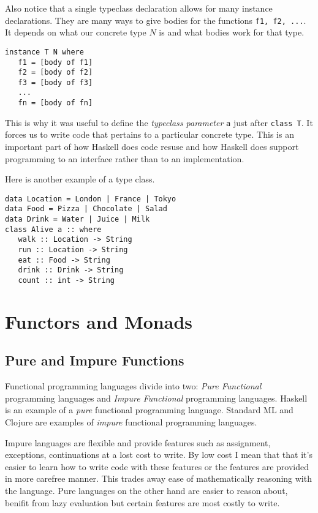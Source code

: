 Also notice that a single typeclass declaration allows for many instance declarations. 
They are many ways to give bodies for the functions \lstinline{f1, f2, ...}. 
It depends on what our concrete type $N$ is and what bodies work for that type. 

\begin{lstlisting}
instance T N where
   f1 = [body of f1]
   f2 = [body of f2]
   f3 = [body of f3]
   ...
   fn = [body of fn]
\end{lstlisting}

This is why it was useful to define the \textit{typeclass parameter}
\lstinline{a} just after \lstinline{class T}. It forces us to write 
 code that pertains to a particular concrete type. 
This is an important part of how Haskell does code resuse and how Haskell 
does support programming to an interface rather than to an implementation. 




Here is another example of a type class. 
\begin{lstlisting}
data Location = London | France | Tokyo
data Food = Pizza | Chocolate | Salad
data Drink = Water | Juice | Milk
class Alive a :: where
   walk :: Location -> String
   run :: Location -> String
   eat :: Food -> String
   drink :: Drink -> String
   count :: int -> String
\end{lstlisting}






\chapter{Functors and Monads}

\section{Pure and Impure Functions}

Functional programming languages divide into two: \textit{Pure Functional} programming languages 
and \textit{Impure Functional} programming languages. Haskell is an example of a \textit{pure} functional programming language. 
Standard ML and Clojure are examples of \textit{impure} functional programming languages.

Impure languages are flexible and provide features such as assignment, exceptions, 
continuations at a lost cost to write. By low cost I mean that that it's easier to learn how to write code with these features or the features are provided in more carefree manner. 
This trades away ease of mathematically reasoning with the language.
Pure languages on the other hand are easier to reason about, benifit from lazy evaluation
but certain features are most costly to write.

